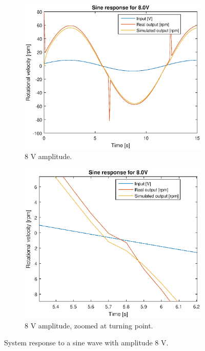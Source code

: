 \begin{figure}[H]
    \centering
    \begin{subfigure}[H]{0.48\textwidth}
    \includegraphics[width=\textwidth]{./img/testrig_8Vsine_no_i_fric.eps}
    \caption{8 V amplitude.}
    \label{fig:sin82}
    \end{subfigure}
    \begin{subfigure}[H]{0.48\textwidth}
    \includegraphics[width=\textwidth]{./img/testrig_8Vsine_no_i_fric_zoom.eps}
    \caption{8 V amplitude, zoomed at turning point.}
    \label{fig:sin82z}
    \end{subfigure}
    \caption{System response to a sine wave with amplitude 8 V.}
\end{figure}

